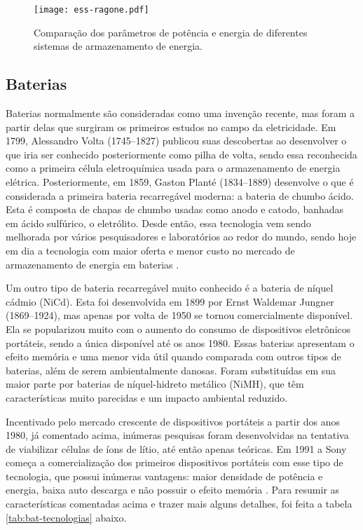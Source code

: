       \begin{figure}[!htb]
         \centering
         \texttt{[image: ess-ragone.pdf]}
         \caption{Comparação dos parâmetros de potência e energia de diferentes sistemas de armazenamento de energia.}
         \label{fig:ess-ragone}
      \end{figure}

   \subsection{Baterias}

      Baterias normalmente são consideradas como uma invenção recente, mas foram a partir delas que surgiram os primeiros estudos no campo da eletricidade. Em 1799, Alessandro Volta (1745–1827) publicou suas descobertas ao desenvolver o que iria ser conhecido posteriormente como pilha de volta, sendo essa reconhecida como a primeira célula eletroquímica usada para o armazenamento de energia elétrica. Posteriormente, em 1859, Gaston Planté (1834–1889) desenvolve o que é considerada a primeira bateria recarregável moderna: a bateria de chumbo ácido. Esta é composta de chapas de chumbo usadas como anodo e catodo, banhadas em ácido sulfúrico, o eletrólito. Desde então, essa tecnologia vem sendo melhorada por vários pesquisadores e laboratórios ao redor do mundo, sendo hoje em dia a tecnologia com maior oferta e menor custo no mercado de armazenamento de energia em baterias \cite{War15}.

      Um outro tipo de bateria recarregável muito conhecido é a bateria de níquel cádmio (NiCd). Esta foi desenvolvida em 1899 por Ernst Waldemar Jungner (1869–1924), mas apenas por volta de 1950 se tornou comercialmente disponível. Ela se popularizou muito com o aumento do consumo de dispositivos eletrônicos portáteis, sendo a única disponível até os anos 1980. Essas baterias apresentam o efeito memória e uma menor vida útil quando comparada com outros tipos de baterias, além de serem ambientalmente danosas. Foram substituídas em sua maior parte por baterias de níquel-hidreto metálico (NiMH), que têm características muito parecidas e um impacto ambiental reduzido.

      Incentivado pelo mercado crescente de dispositivos portáteis a partir dos anos 1980, já comentado acima, inúmeras pesquisas foram desenvolvidas na tentativa de viabilizar células de íons de lítio, até então apenas teóricas. Em 1991 a Sony começa a comercialização dos primeiros dispositivos portáteis com esse tipo de tecnologia, que possui inúmeras vantagens: maior densidade de potência e energia, baixa auto descarga e não possuir o efeito memória \cite{War15}. Para resumir as características comentadas acima e trazer mais alguns detalhes, foi feita a tabela \ref{tab:bat-tecnologias} abaixo.

